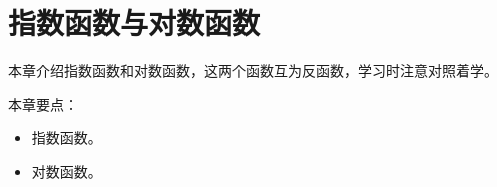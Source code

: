 \chapter{指数函数与对数函数}

本章介绍指数函数和对数函数，这两个函数互为反函数，学习时注意对照着学。

本章要点：
\begin{itemize}
    \item 指数函数。
    \item 对数函数。
\end{itemize}

\newpage


\newpage


\newpage


\newpage


\newpage


\newpage





